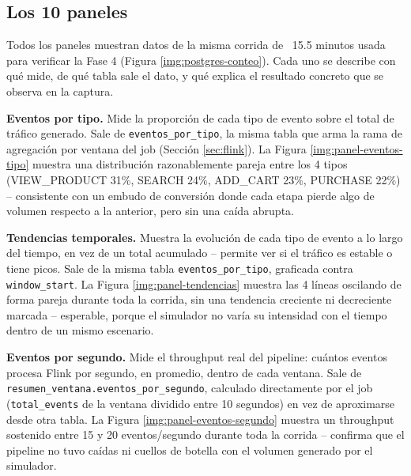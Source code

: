 
\subsection{Los 10 paneles}

Todos los paneles muestran datos de la misma corrida de ~15.5 minutos usada para verificar la Fase 4 (Figura \ref{img:postgres-conteo}). Cada uno se describe con qué mide, de qué tabla sale el dato, y qué explica el resultado concreto que se observa en la captura.

\textbf{Eventos por tipo.} Mide la proporción de cada tipo de evento sobre el total de tráfico generado. Sale de \texttt{eventos\_por\_tipo}, la misma tabla que arma la rama de agregación por ventana del job (Sección \ref{sec:flink}). La Figura \ref{img:panel-eventos-tipo} muestra una distribución razonablemente pareja entre los 4 tipos (VIEW\_PRODUCT 31\%, SEARCH 24\%, ADD\_CART 23\%, PURCHASE 22\%) -- consistente con un embudo de conversión donde cada etapa pierde algo de volumen respecto a la anterior, pero sin una caída abrupta.


\textbf{Tendencias temporales.} Muestra la evolución de cada tipo de evento a lo largo del tiempo, en vez de un total acumulado -- permite ver si el tráfico es estable o tiene picos. Sale de la misma tabla \texttt{eventos\_por\_tipo}, graficada contra \texttt{window\_start}. La Figura \ref{img:panel-tendencias} muestra las 4 líneas oscilando de forma pareja durante toda la corrida, sin una tendencia creciente ni decreciente marcada -- esperable, porque el simulador no varía su intensidad con el tiempo dentro de un mismo escenario.


\textbf{Eventos por segundo.} Mide el throughput real del pipeline: cuántos eventos procesa Flink por segundo, en promedio, dentro de cada ventana. Sale de \texttt{resumen\_ventana.eventos\_por\_segundo}, calculado directamente por el job (\texttt{total\_events} de la ventana dividido entre 10 segundos) en vez de aproximarse desde otra tabla. La Figura \ref{img:panel-eventos-segundo} muestra un throughput sostenido entre 15 y 20 eventos/segundo durante toda la corrida -- confirma que el pipeline no tuvo caídas ni cuellos de botella con el volumen generado por el simulador.

